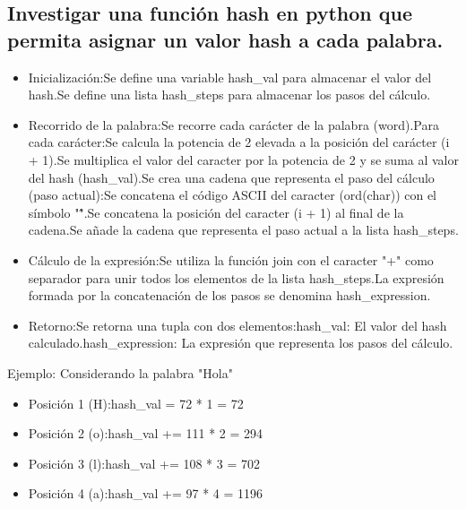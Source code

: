 \newpage
\subsection{Investigar una función hash en python que permita asignar un valor hash a cada palabra.}
\begin{itemize}
  \item Inicialización:\newline Se define una variable hash\_val para almacenar el valor del hash.\newline Se define una lista hash\_steps para almacenar los pasos del cálculo.
  \item Recorrido de la palabra:\newline Se recorre cada carácter de la palabra (word).\newline Para cada carácter:\newline Se calcula la potencia de 2 elevada a la posición del carácter (i + 1).\newline Se multiplica el valor del caracter por la potencia de 2 y se suma al valor del hash (hash\_val).\newline Se crea una cadena que representa el paso del cálculo (paso actual):\newline Se concatena el código ASCII del caracter (ord(char)) con el símbolo "\^".\newline Se concatena la posición del caracter (i + 1) al final de la cadena.\newline Se añade la cadena que representa el paso actual a la lista hash\_steps.
  \item Cálculo de la expresión:\newline Se utiliza la función join con el caracter "+" como separador para unir todos los elementos de la lista hash\_steps.\newline La expresión formada por la concatenación de los pasos se denomina hash\_expression.
  \item Retorno:\newline Se retorna una tupla con dos elementos:\newline hash\_val: El valor del hash calculado.\newline hash\_expression: La expresión que representa los pasos del cálculo.
\end{itemize}
Ejemplo:
Considerando la palabra "Hola"
\begin{itemize}
  \item Posición 1 (H):\newline hash\_val = 72 * 1 = 72
  \item Posición 2 (o):\newline hash\_val += 111 * 2 = 294
  \item Posición 3 (l):\newline hash\_val += 108 * 3 = 702
  \item Posición 4 (a):\newline hash\_val += 97 * 4 = 1196
\end{itemize}

